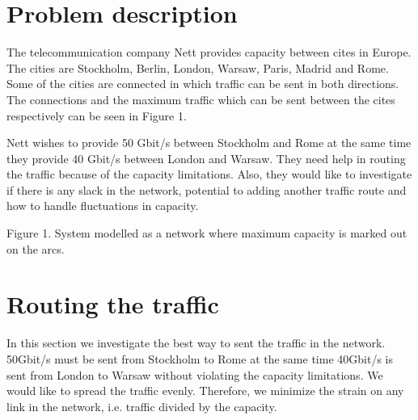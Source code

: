 \newpage
\section{Problem description}
The telecommunication company Nett provides capacity between cites in Europe. The cities are Stockholm, Berlin, London, Warsaw, Paris, Madrid and Rome. Some of the cities are connected in which traffic can be sent in both directions. The connections and the maximum traffic which can be sent between the cites respectively can be seen in Figure 1.

Nett wishes to provide 50 Gbit/s between Stockholm and Rome at the same time they provide 40 Gbit/s between London and Warsaw. They need help in routing the traffic because of the capacity limitations. Also, they would like to investigate if there is any slack in the network, potential to adding another traffic route and how to handle fluctuations in capacity.

\begin{center}
\end{center}
Figure 1. System modelled as a network where maximum capacity is marked out on the arcs.

\newpage

\section{Routing the traffic}
In this section we investigate the best way to sent the traffic in the network. 50Gbit/s must be sent from Stockholm to Rome at the same time 40Gbit/s is sent from London to Warsaw without violating the capacity limitations. We would like to spread the traffic evenly. Therefore, we minimize the strain on any link in the network, i.e. traffic divided by the capacity.

